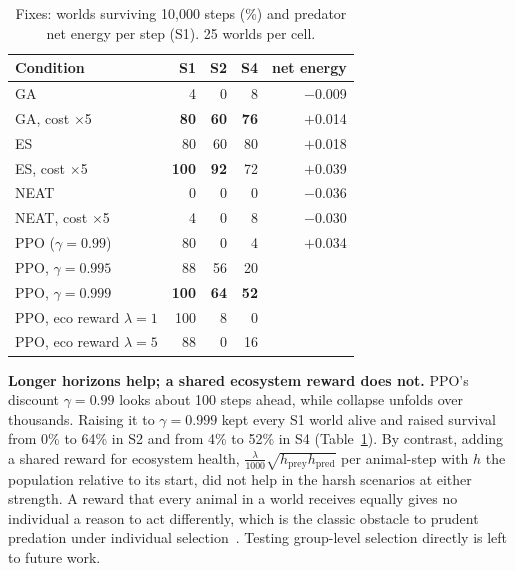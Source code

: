\documentclass[conference]{IEEEtran}
\begin{document}
\begin{table}[t]
\centering
\caption{Fixes: worlds surviving 10,000 steps (\%) and predator net energy per step (S1). 25 worlds per cell.}
\label{tab:fixes}
\setlength{\tabcolsep}{3.2pt}
\begin{tabular}{lrrrr}
\toprule
Condition & S1 & S2 & S4 & net energy \\
\midrule
GA                         &  4 &  0 &  8 & $-$0.009 \\
GA, cost $\times$5         & \textbf{80} & \textbf{60} & \textbf{76} & $+$0.014 \\
ES                         & 80 & 60 & 80 & $+$0.018 \\
ES, cost $\times$5         & \textbf{100} & \textbf{92} & 72 & $+$0.039 \\
NEAT                       &  0 &  0 &  0 & $-$0.036 \\
NEAT, cost $\times$5       &  4 &  0 &  8 & $-$0.030 \\
\midrule
PPO ($\gamma=0.99$)        & 80 &  0 &  4 & $+$0.034 \\
PPO, $\gamma=0.995$        & 88 & 56 & 20 & \\
PPO, $\gamma=0.999$        & \textbf{100} & \textbf{64} & \textbf{52} & \\
PPO, eco reward $\lambda=1$ & 100 & 8 & 0 & \\
PPO, eco reward $\lambda=5$ & 88 & 0 & 16 & \\
\bottomrule
\end{tabular}
\end{table}

\textbf{Longer horizons help; a shared ecosystem reward does not.} PPO's discount $\gamma=0.99$ looks about 100 steps ahead, while collapse unfolds over thousands. Raising it to $\gamma=0.999$ kept every S1 world alive and raised survival from 0\% to 64\% in S2 and from 4\% to 52\% in S4 (Table~\ref{tab:fixes}). By contrast, adding a shared reward for ecosystem health, $\frac{\lambda}{1000}\sqrt{h_\text{prey}h_\text{pred}}$ per animal-step with $h$ the population relative to its start, did not help in the harsh scenarios at either strength. A reward that every animal in a world receives equally gives no individual a reason to act differently, which is the classic obstacle to prudent predation under individual selection~\cite{slobodkin1968,traulsen2006}. Testing group-level selection directly is left to future work.
\end{document}
